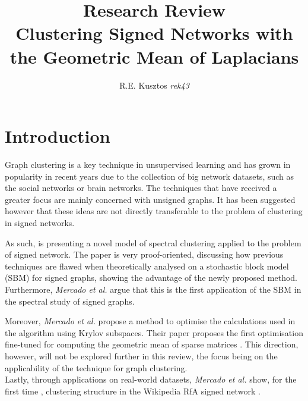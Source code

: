 \documentclass[11pt]{article}
\title{Research Review \\
  \large Clustering Signed Networks with the Geometric Mean of Laplacians 
  \cite{mercado2016clustering}
}
\author{R.E. Kusztos \emph{rek43}}
\begin{document}
 

\maketitle


\section{Introduction}
  Graph clustering is a key technique in unsupervised learning and has grown 
in popularity in recent years due to the collection of big network datasets, 
such as the social networks or  brain networks. The techniques that have received
a greater focus are mainly concerned with unsigned graphs. It has been suggested 
however that these ideas are not directly transferable to the problem of clustering 
in signed networks. 

  As such, \cite{mercado2016clustering} is presenting a novel model of spectral
clustering applied to the problem of signed network. The paper is very proof-oriented,
discussing how previous techniques are flawed when theoretically analysed on 
a stochastic block model (SBM) \cite{rohe2011spectral} for signed graphs, 
showing the advantage of the newly proposed method. Furthermore, \emph{Mercado et al.}
argue that this is the first application of the SBM in the spectral study of 
signed graphs.  

  Moreover, \emph{Mercado et al.} propose a method to optimise the calculations
used in the algorithm using Krylov subspaces. Their paper proposes the first optimisation
fine-tuned for computing the geometric mean of sparse matrices \cite{mercado2016clustering}.
This direction, however, will not be explored further in this review, the focus being 
on the applicability of the technique for graph clustering. \\
  Lastly, through applications on real-world datasets, \emph {Mercado et al.}
show, for the first time \cite{mercado2016clustering}, clustering structure in the 
Wikipedia RfA signed network \cite{snapnets}. \\
  
\end{document}
